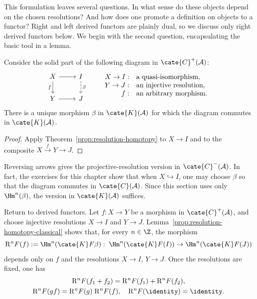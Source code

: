 This formulation leaves several questions. In what sense do these objects
depend on the chosen resolutions? And how does one promote a definition on
objects to a functor? Right and left derived functors are plainly dual, so we
discuss only right derived functors below. We begin with the second question,
encapsulating the basic tool in a lemma.

\begin{lemma}\label{prop:resolution-homotopy-classical}
	Consider the solid part of the following diagram in
	$\cate{C}^+(\mathcal{A})$:
	\[\begin{tikzcd}
		X \arrow[d, "f"'] \arrow[r] & I \arrow[dashed, d, "\beta"]\\
		Y \arrow[r] & J
	\end{tikzcd} \qquad \begin{array}{rl}
		X \to I: & \text{a quasi-isomorphism}, \\
		Y \to J: & \text{an injective resolution}, \\
		f: & \text{an arbitrary morphism}.
	\end{array}\]
	There is a unique morphism $\beta$ in $\cate{K}(\mathcal{A})$ for which
	the diagram commutes in $\cate{K}(\mathcal{A})$.
\end{lemma}
\begin{proof}
	Apply Theorem~\ref{prop:resolution-homotopy} to $X\to I$ and to the
	composite $X\xrightarrow{f}Y\to J$.
\end{proof}

Reversing arrows gives the projective-resolution version in
$\cate{C}^-(\mathcal{A})$. In fact, the exercises for this chapter show that
when $X\hookrightarrow I$, one may choose $\beta$ so that the diagram commutes
in $\cate{C}(\mathcal{A})$. Since this section uses only $\Hm^n(\beta)$, the
version in $\cate{K}(\mathcal{A})$ suffices.

Return to derived functors. Let $f:X\to Y$ be a morphism in
$\cate{C}^+(\mathcal{A})$, and choose injective resolutions $X\to I$ and
$Y\to J$. Lemma~\ref{prop:resolution-homotopy-classical} shows that, for every
$n\in\Z$, the morphism
\[ \mathrm{R}^n F(f) := \Hm^n(\cate{K}F\beta): \; \Hm^n(\cate{K}F(I)) \to \Hm^n(\cate{K}F(J)) \]
depends only on $f$ and the resolutions $X\to I$, $Y\to J$. Once the
resolutions are fixed, one has
\begin{gather*}
	\mathrm{R}^n F(f_1 + f_2) = \mathrm{R}^n F(f_1) + \mathrm{R}^n F(f_2), \\
	\mathrm{R}^n F(gf) = \mathrm{R}^n F(g) \; \mathrm{R}^n F(f), \quad \mathrm{R}^n F(\identity) = \identity.
\end{gather*}

